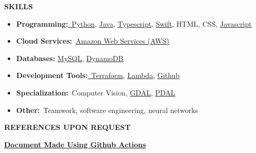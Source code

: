 \textbf{SKILLS}

\begin{itemize}
\item
  \textbf{Programming:}\href{https://www.python.org/}{\ul{~Python}},
  \href{https://www.java.com/en/}{\ul{Java}},
  \href{https://www.typescriptlang.org/}{\ul{Typescript}},
  \href{https://www.swift.org/}{\ul{Swift}}, HTML, CSS,
  \href{https://www.javascript.com/}{\ul{Javascript}}
\item
  \textbf{Cloud
  Services:}~\href{https://aws.amazon.com/free/?gclid=CjwKCAiAiOa9BhBqEiwABCdG8xJm7dpo0Ifa4i8UYcSexU289wg1I5QgB0YQaTpD3Cc5l3oCR2H94hoCvTYQAvD_BwE\&trk=6a4c3e9d-cdc9-4e25-8dd9-2bd8d15afbca\&sc_channel=ps\&ef_id=CjwKCAiAiOa9BhBqEiwABCdG8xJm7dpo0Ifa4i8UYcSexU289wg1I5QgB0YQaTpD3Cc5l3oCR2H94hoCvTYQAvD_BwE:G:s\&s_kwcid=AL!4422!3!651751059777!e!!g!!amazon\%20web\%20services!19852662197!145019195737\&all-free-tier.sort-by=item.additionalFields.SortRank\&all-free-tier.sort-order=asc\&awsf.Free\%20Tier\%20Types=*all\&awsf.Free\%20Tier\%20Categories=*all}{\ul{Amazon
  Web Services (AWS)}}
\item
  \textbf{Databases:} \href{https://www.mysql.com/}{\ul{MySQL}},
  \href{https://aws.amazon.com/dynamodb/}{\ul{DynamoDB}}
\item
  \textbf{Development
  Tools:}\href{https://developer.hashicorp.com/terraform/language}{\ul{~Terraform}},
  \href{https://aws.amazon.com/pm/lambda/?gclid=CjwKCAiAiOa9BhBqEiwABCdG8_-jcsK9i3KVP2t5NgupDXinpyF36M-7OgfzGPhJI0F8zaahD0sMmBoC8NIQAvD_BwE\&trk=e0e0d4be-47fe-4336-ab69-7eece7f3d36e\&sc_channel=ps\&ef_id=CjwKCAiAiOa9BhBqEiwABCdG8_-jcsK9i3KVP2t5NgupDXinpyF36M-7OgfzGPhJI0F8zaahD0sMmBoC8NIQAvD_BwE:G:s\&s_kwcid=AL!4422!3!652240143523!e!!g!!amazon\%20lambda!19878797032!147151597893}{\ul{Lambda}},
  \href{https://github.com/}{\ul{Github}}
\item
  \textbf{Specialization:}~Computer Vision,
  \href{https://gdal.org/en/stable/}{\ul{GDAL}},
  \href{https://pdal.io/en/2.8.4/}{\ul{PDAL}}
\item
  \textbf{Other:}~Teamwork, software engineering, neural networks
\end{itemize}

\textbf{REFERENCES UPON REQUEST}

\href{http://github.com/TomTheTonk/Resume}{\textbf{\ul{Document Made
Using Github Actions}}}
